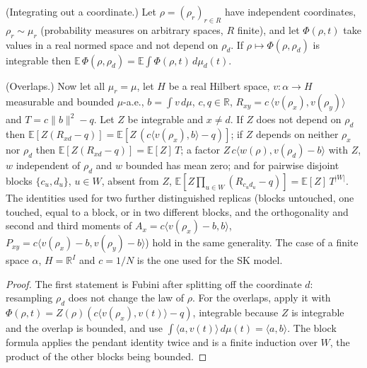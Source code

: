 \begin{theorem}
\label{thm:sg-tal:replica-integrate-out}
\leanok
{}
(Integrating out a coordinate.) Let $\rho=(\rho_r)_{r\in R}$ have independent coordinates, $\rho_r\sim\mu_r$
(probability measures on arbitrary spaces, $R$ finite), and let $\Phi(\rho,t)$ take values in a real normed space
and not depend on $\rho_d$. If $\rho\mapsto\Phi(\rho,\rho_d)$ is integrable then
$\mathbb E\,\Phi(\rho,\rho_d)=\mathbb E\int\Phi(\rho,t)\,d\mu_d(t)$.

(Overlaps.) Now let all $\mu_r=\mu$, let $H$ be a real Hilbert space, $v:\alpha\to H$ measurable and bounded
$\mu$-a.e., $b=\int v\,d\mu$, $c,q\in\mathbb R$, $R_{xy}=c\,\langle v(\rho_x),v(\rho_y)\rangle$ and
$T=c\|b\|^2-q$. Let $Z$ be integrable and $x\ne d$. If $Z$ does not depend on $\rho_d$ then
$\mathbb E[Z(R_{xd}-q)]=\mathbb E[Z\,(c\langle v(\rho_x),b\rangle-q)]$; if $Z$ depends on neither $\rho_x$ nor
$\rho_d$ then $\mathbb E[Z(R_{xd}-q)]=\mathbb E[Z]\,T$; a factor $Z\,c\langle w(\rho),v(\rho_d)-b\rangle$ with
$Z$, $w$ independent of $\rho_d$ and $w$ bounded has mean zero; and for pairwise disjoint blocks $\{c_u,d_u\}$,
$u\in W$, absent from $Z$,
$\mathbb E[Z\prod_{u\in W}(R_{c_ud_u}-q)]=\mathbb E[Z]\,T^{|W|}$.
The identities used for two further distinguished replicas (blocks untouched, one touched, equal to a block, or in
two different blocks, and the orthogonality and second and third moments of
$A_x=c\langle v(\rho_x)-b,b\rangle$, $P_{xy}=c\langle v(\rho_x)-b,v(\rho_y)-b\rangle$) hold in the same
generality. The case of a finite space $\alpha$, $H=\mathbb R^I$ and $c=1/N$ is the one used for the SK model.
\end{theorem}
\begin{proof}
\leanok
The first statement is Fubini after splitting off the coordinate $d$: resampling $\rho_d$ does not change the law of
$\rho$. For the overlaps, apply it with $\Phi(\rho,t)=Z(\rho)(c\langle v(\rho_x),v(t)\rangle-q)$, integrable because
$Z$ is integrable and the overlap is bounded, and use $\int\langle a,v(t)\rangle\,d\mu(t)=\langle a,b\rangle$.
The block formula applies the pendant identity twice and is a finite induction over $W$, the product of the other
blocks being bounded.
\end{proof}

